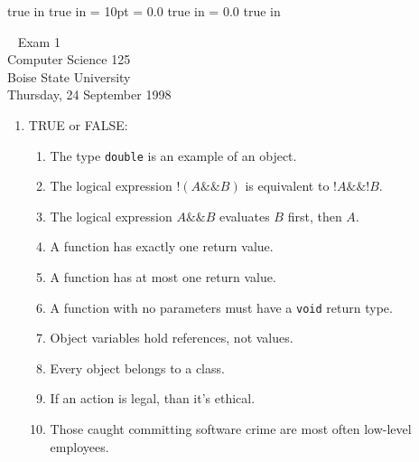 \pagestyle{empty}
 true in
 true in
\topmargin = 10pt
\oddsidemargin = 0.0 true in
\evensidemargin = 0.0 true in
\newcommand{\ul}{\underline}
\newcommand{\spa}{\hspace{.25in}}


{\Large
\begin{center}
\mbox{ }
    Exam 1 \\
    Computer Science 125 \\ 
    Boise State University\\ 
    Thursday, 24 September 1998
\end{center}
}

\begin{enumerate}

   \item TRUE or FALSE:
	\begin{enumerate}
	    \item \underline{\hspace{.25in}} The type {\tt double}
		is an example of an object.
	    \item \underline{\hspace{.25in}} The logical expression
		$!(A\&\&B)$ is equivalent to $!A\&\&!B$.
	    \item \underline{\hspace{.25in}} The logical expression
		$A\&\&B$ evaluates $B$ first, then $A$.
	    \item \underline{\hspace{.25in}} A function has exactly
		one return value.
	    \item \underline{\hspace{.25in}} A function has at most
		one return value.
	    \item \underline{\hspace{.25in}} A function with no
		parameters must have a {\tt void} return type.
	    \item \underline{\hspace{.25in}} Object variables hold
		references, not values.
	    \item \underline{\hspace{.25in}} Every object belongs
		to a class.
	    \item \underline{\hspace{.25in}} If an action is 
		legal, than it's ethical.
	    \item \underline{\hspace{.25in}} Those caught committing
		software crime are most often low-level employees.
	\end{enumerate}


\end{enumerate}
